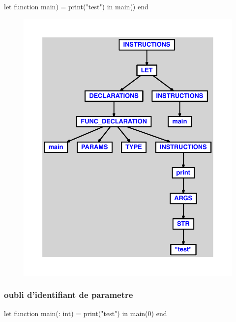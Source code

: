 \documentclass{article}
\begin{document}
\begin{verbatimtab}
let
	function main) = print("test")
in main() end
\end{verbatimtab}
\begin{figure}[H]\centering\includegraphics[max width=\textwidth]{ast/ast_207.pdf}\end{figure}\subsubsection{oubli d'identifiant de parametre}
\begin{verbatimtab}
let
	function main(: int) = print("test")
in main(0) end
\end{verbatimtab}
\end{document}
